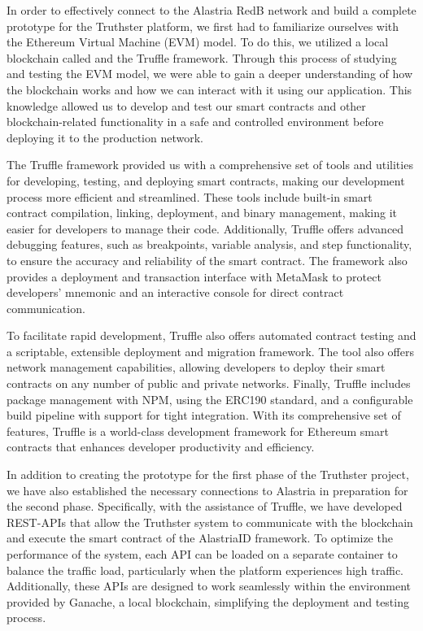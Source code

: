 \documentclass[target=mst,aauheader=]{thud}
\begin{document}
In order to effectively connect to the Alastria RedB network and build a complete prototype for the Truthster platform, we first had to familiarize ourselves with the Ethereum Virtual Machine (EVM) model. To do this, we utilized a local blockchain called  and the Truffle \cite{truffle} framework. Through this process of studying and testing the EVM model, we were able to gain a deeper understanding of how the blockchain works and how we can interact with it using our application. This knowledge allowed us to develop and test our smart contracts and other blockchain-related functionality in a safe and controlled environment before deploying it to the production network.\par
The Truffle framework provided us with a comprehensive set of tools and utilities for developing, testing, and deploying smart contracts, making our development process more efficient and streamlined. These tools include built-in smart contract compilation, linking, deployment, and binary management, making it easier for developers to manage their code. Additionally, Truffle offers advanced debugging features, such as breakpoints, variable analysis, and step functionality, to ensure the accuracy and reliability of the smart contract. The framework also provides a deployment and transaction interface with MetaMask to protect developers' mnemonic and an interactive console for direct contract communication.\par
To facilitate rapid development, Truffle also offers automated contract testing and a scriptable, extensible deployment and migration framework. The tool also offers network management capabilities, allowing developers to deploy their smart contracts on any number of public and private networks. Finally, Truffle includes package management with NPM, using the ERC190 standard, and a configurable build pipeline with support for tight integration. With its comprehensive set of features, Truffle is a world-class development framework for Ethereum smart contracts that enhances developer productivity and efficiency.\par

In addition to creating the prototype for the first phase of the Truthster project, we have also established the necessary connections to Alastria in preparation for the second phase. Specifically, with the assistance of Truffle, we have developed REST-APIs that allow the Truthster system to communicate with the blockchain and execute the smart contract of the AlastriaID framework.
To optimize the performance of the system, each API can be loaded on a separate container to balance the traffic load, particularly when the platform experiences high traffic. Additionally, these APIs are designed to work seamlessly within the environment provided by Ganache, a local blockchain, simplifying the deployment and testing process.
\end{document}
